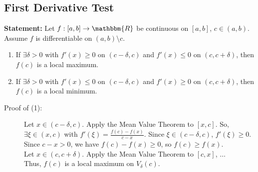 \documentclass[10pt]{extarticle}
\newcommand{\R}{\mathbbm{R}}
\begin{document}
  \subsection{First Derivative Test}%
  \textbf{Statement:} Let $f: [a,b]\rightarrow \R$ be continuous on $[a,b]$, $c\in (a,b)$. Assume $f$ is differentiable on $(a,b) \setminus c$.
  \begin{enumerate}[(1)]
    \item If $\exists \delta>0$ with $f'(x) \geq 0$ on $(c-\delta,c)$ and $f'(x) \leq 0$ on $(c,c+\delta)$, then $f(c)$ is a local maximum.
    \item If $\exists \delta>0$ with $f'(x) \leq 0$ on $(c-\delta,c)$ and $f'(x) \geq 0$ on $(c,c+\delta)$, then $f(c)$ is a local minimum.
  \end{enumerate}
  \begin{description}
    \item[Proof of (1):] Let $x\in (c-\delta,c)$. Apply the Mean Value Theorem to $[x,c]$. So, $\exists \xi\in(x,c)$ with $f'(\xi) = \frac{f(c)-f(x)}{c-x}$. Since $\xi\in (c-\delta,c)$, $f'(\xi) \geq 0$.\\

      Since $c-x > 0$, we have $f(c)-f(x) \geq 0$, so $f(c) \geq f(x)$.\\

      Let $x\in (c,c+\delta)$. Apply the Mean Value Theorem to $[c,x]$, $\dots$\\

      Thus, $f(c)$ is a local maximum on $V_{\delta}(c)$.
  \end{description}
\end{document}
